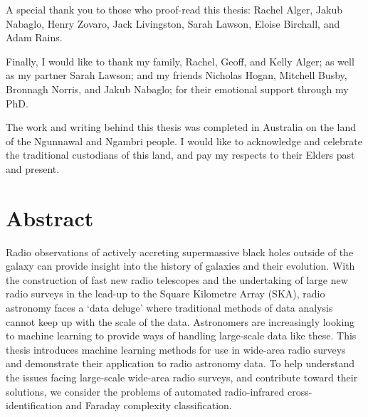 \documentclass[11pt, a4paper]{book}
\begin{document}
A special thank you to those who proof-read this thesis: Rachel Alger, Jakub Nabaglo, Henry Zovaro, Jack Livingston, Sarah Lawson, Eloise Birchall, and Adam Rains.

Finally, I would like to thank my family, Rachel, Geoff, and Kelly Alger; as well as my partner Sarah Lawson; and my friends Nicholas Hogan, Mitchell Busby, Bronnagh Norris, and Jakub Nabaglo; for their emotional support through my PhD.

\clearpage

The work and writing behind this thesis was completed in Australia on the land of the Ngunnawal and Ngambri people. I would like to acknowledge and celebrate the traditional custodians of this land, and pay my respects to their Elders past and present.


\cleardoublepage
\pagestyle{headings}
\chapter*{Abstract}
\vspace{-1em}

Radio observations of actively accreting supermassive black holes outside of the galaxy can provide insight into the history of galaxies and their evolution. With the construction of fast new radio telescopes and the undertaking of large new radio surveys in the lead-up to the Square Kilometre Array (SKA), radio astronomy faces a `data deluge' where traditional methods of data analysis cannot keep up with the scale of the data. Astronomers are increasingly looking to machine learning to provide ways of handling large-scale data like these. This thesis introduces machine learning methods for use in wide-area radio surveys and demonstrate their application to radio astronomy data. To help understand the issues facing large-scale wide-area radio surveys, and contribute toward their solutions, we consider the problems of automated radio-infrared cross-identification and Faraday complexity classification.
\end{document}
